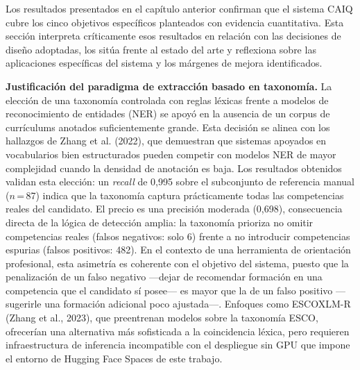 
Los resultados presentados en el capítulo anterior confirman que el sistema CAIQ cubre los cinco objetivos específicos planteados con evidencia cuantitativa. Esta sección interpreta críticamente esos resultados en relación con las decisiones de diseño adoptadas, los sitúa frente al estado del arte y reflexiona sobre las aplicaciones específicas del sistema y los márgenes de mejora identificados.

\textbf{Justificación del paradigma de extracción basado en taxonomía.} La elección de una taxonomía controlada con reglas léxicas frente a modelos de reconocimiento de entidades (NER) se apoyó en la ausencia de un corpus de currículums anotados suficientemente grande. Esta decisión se alinea con los hallazgos de Zhang et al. (2022), que demuestran que sistemas apoyados en vocabularios bien estructurados pueden competir con modelos NER de mayor complejidad cuando la densidad de anotación es baja. Los resultados obtenidos validan esta elección: un \textit{recall} de 0,995 sobre el subconjunto de referencia manual ($n$\,=\,87) indica que la taxonomía captura prácticamente todas las competencias reales del candidato. El precio es una precisión moderada (0,698), consecuencia directa de la lógica de detección amplia: la taxonomía prioriza no omitir competencias reales (falsos negativos: solo 6) frente a no introducir competencias espurias (falsos positivos: 482). En el contexto de una herramienta de orientación profesional, esta asimetría es coherente con el objetivo del sistema, puesto que la penalización de un falso negativo —dejar de recomendar formación en una competencia que el candidato sí posee— es mayor que la de un falso positivo —sugerirle una formación adicional poco ajustada—. Enfoques como ESCOXLM-R (Zhang et al., 2023), que preentrenan modelos sobre la taxonomía ESCO, ofrecerían una alternativa más sofisticada a la coincidencia léxica, pero requieren infraestructura de inferencia incompatible con el despliegue sin GPU que impone el entorno de Hugging Face Spaces de este trabajo.

